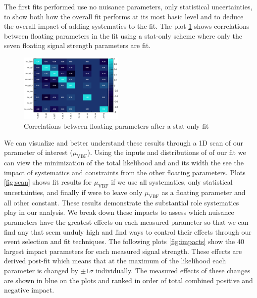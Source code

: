 The first fits performed use no nuisance parameters, only statistical uncertainties, to show both how the overall fit performs at its most basic level and to deduce the overall impact of adding systematics to the fit. The plot \ref{fig:correlations} shows correlations between floating parameters in the fit using a stat-only scheme where only the seven floating signal strength parameters are fit.

\begin{figure}[!h]
\centering
\includegraphics[width=0.45\textwidth]{Pictures/fitresults/correlation_stat.eps}
\caption{Correlations between floating parameters after a stat-only fit}
\label{fig:correlations}
\end{figure}

We can visualize and better understand these results through a 1D scan of our parameter of interest ($\mu_{\text{VBF}}$). Using the inputs and distributions of of our fit we can view the minimization of the total likelihood and and its width the see the impact of systematics and constraints from the other floating parameters. Plots \ref{fig:scan} shows fit results for $\mu_{\text{VBF}}$ if we use all systematics, only statistical uncertainties, and finally if were to leave only $\mu_{\text{VBF}}$ as a floating parameter and all other constant. These results demonstrate the substantial role systematics play in our analysis. We break down these impacts to assess which nuisance parameters have the greatest effects on each measured parameter so that we can find any that seem unduly high and find ways to control their effects through our event selection and fit techniques. The following plots \ref{fig:impacts} show the 40 largest impact parameters for each measured signal strength. These effects are derived post-fit which means that at the maximum of the likelihood each parameter is changed by $\pm 1\sigma$ individually. The measured effects of these changes are shown in blue on the plots and ranked in order of total combined positive and negative impact. 

